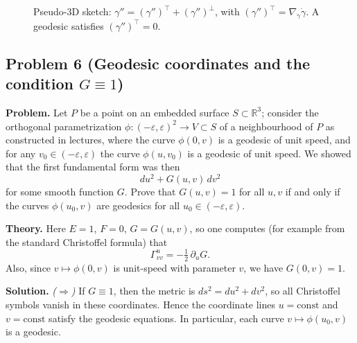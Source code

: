 \documentclass[12pt,a4paper]{article}
\theoremstyle{plain}
\theoremstyle{definition}      %
\begin{document}
\begin{figure}[H]
	\caption{Pseudo-3D sketch: $\gamma''=(\gamma'')^{\top}+(\gamma'')^{\perp}$, with
		$(\gamma'')^{\top}=\nabla_{\dot\gamma}\dot\gamma$. A geodesic satisfies $(\gamma'')^{\top}=0$.}
\end{figure}



\subsection*{Problem 6 (Geodesic coordinates and the condition $G\equiv 1$)}
\textbf{Problem.}
Let $P$ be a point on an embedded surface $S\subset \mathbb{R}^3$; consider the orthogonal parametrization
$\phi:(-\varepsilon,\varepsilon)^2\to V\subset S$ of a neighbourhood of $P$ as constructed in lectures, where the curve
$\phi(0,v)$ is a geodesic of unit speed, and for any $v_0\in(-\varepsilon,\varepsilon)$ the curve $\phi(u,v_0)$ is
a geodesic of unit speed. We showed that the first fundamental form was then
\[
du^2 + G(u,v)\,dv^2
\]
for some smooth function $G$. Prove that $G(u,v)=1$ for all $u,v$ if and only if the curves $\phi(u_0,v)$ are
geodesics for all $u_0\in(-\varepsilon,\varepsilon)$.

\medskip
\textbf{Theory.}
Here $E=1$, $F=0$, $G=G(u,v)$, so one computes (for example from the standard Christoffel formula) that
\[
\Gamma^{u}_{vv}=-\tfrac12\,\partial_u G.
\]
Also, since $v\mapsto \phi(0,v)$ is unit-speed with parameter $v$, we have $G(0,v)=1$.

\medskip
\textbf{Solution.}
\emph{($\Rightarrow$)} If $G\equiv 1$, then the metric is $ds^2=du^2+dv^2$, so all Christoffel symbols vanish in
these coordinates. Hence the coordinate lines $u=\mathrm{const}$ and $v=\mathrm{const}$ satisfy the geodesic equations.
In particular, each curve $v\mapsto \phi(u_0,v)$ is a geodesic.
\end{document}
